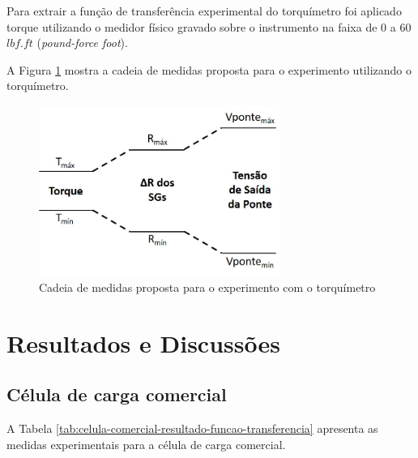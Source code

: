 \documentclass[a4paper]{instrumentacao}
\begin{document}
Para extrair a função de transferência experimental do torquímetro foi aplicado torque utilizando o medidor físico gravado sobre o instrumento na faixa de 0 a 60$lbf.ft$ (\textit{pound-force foot}).

A Figura \ref{fig:torquimetro-cadeia-medidas} mostra a cadeia de medidas proposta para o experimento utilizando o torquímetro.

\begin{figure}[H]
\center
\includegraphics[width=0.7\textwidth]{CadeiaMedidasProposta_Torquimetro.jpg}
\caption{Cadeia de medidas proposta para o experimento com o torquímetro}
\label{fig:torquimetro-cadeia-medidas}
\end{figure}

\chapter{Resultados e Discussões}

\section{Célula de carga comercial}
A Tabela \ref{tab:celula-comercial-resultado-funcao-transferencia} apresenta as medidas experimentais para a célula de carga comercial.
\end{document}
